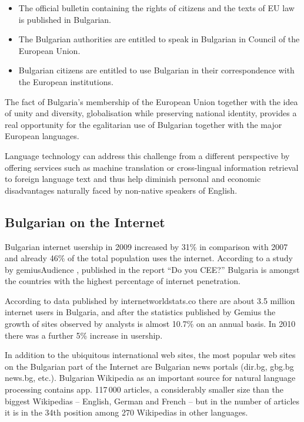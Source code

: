 \documentclass[]{../../metanetpaper}
\begin{document}
\begin{multicols}{2}
\begin{itemize}
\item The official bulletin containing the rights of citizens and the texts of EU law is published in Bulgarian.
\item The Bulgarian authorities are entitled to speak in Bulgarian in Council of the European Union.
\item Bulgarian citizens are entitled to use Bulgarian in their correspondence with the European institutions.
\end{itemize}

The fact of Bulgaria’s membership of the European Union together with the idea of unity and diversity, globalisation while preserving national identity, provides a real opportunity for the egalitarian use of Bulgarian together with the major European languages.

Language technology can address this challenge from a different perspective by offering services such as machine translation or cross-lingual information retrieval to foreign language text and thus help diminish personal and economic disadvantages naturally faced by non-native speakers of English.


\subsection{Bulgarian on the Internet}

Bulgarian internet usership in 2009 increased by 31\% in comparison with 2007 and already 46\% of the total population uses the internet. According to a study by gemiusAudience \cite{gemius}, published in the report ``Do you CEE?'' \cite{inetcee} Bulgaria is amongst the countries with the highest percentage of internet penetration.

According to data published by internetworldstats.co \cite{inetworldstat} there are about 3.5 million internet users in Bulgaria, and after the statistics published by Gemius the growth of sites observed by analysts is almost 10.7\% on an annual basis. In 2010 there was a further 5\% increase in usership.

In addition to the ubiquitous international web sites, the most popular web sites on the Bulgarian part of the Internet are Bulgarian news portals (dir.bg, gbg.bg news.bg, etc.). Bulgarian Wikipedia as an important source for natural language processing contains app. 117\,000 articles, a considerably smaller size than the biggest Wikipedias – English, German and French – but in the number of articles it is in the 34th position \cite{metadata} among 270 Wikipedias in other languages. 


\end{multicols}
\end{document}
